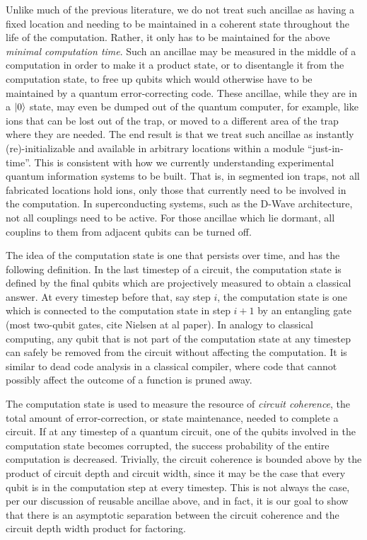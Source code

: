 \documentclass{article}
\begin{document}
Unlike
much of the previous literature, we do not treat such ancillae as having a
fixed location and needing to be maintained in a coherent state throughout
the life of the computation. Rather, it only has to be maintained for the
above \emph{minimal computation time}. Such an ancillae may be measured
in the middle of a computation in order to make it a product state, or
to disentangle it from the computation state, to free up qubits which would
otherwise have to be maintained by a quantum error-correcting code. These
ancillae, while they are in a $\left\vert{0}\right\rangle$ state, may even be dumped out of the
quantum computer, for example, like ions that can be lost out of the trap,
or moved to a different area of the trap where they are needed. The end
result is that we treat such ancillae as instantly (re)-initializable and
available in arbitrary locations within a module ``just-in-time''. This is
consistent with how we currently understanding experimental quantum information
systems to be built. That is, in segmented ion traps, not all fabricated locations
hold ions, only those that currently need to be involved in the computation.
In superconducting systems, such as the D-Wave architecture, not all
couplings need to be active. For those ancillae which lie dormant, all
couplins to them from adjacent qubits can be turned off.

The idea of the computation state is one that persists over time, and has
the following definition. In the last timestep of a circuit, the computation
state is defined by
the final qubits which are projectively measured to obtain a classical
answer. At every timestep before that, say step $i$,
the computation state is one which is connected to the computation state in
step $i+1$ by an entangling gate (most two-qubit gates, cite Nielsen at al
paper). In analogy to classical computing, any qubit that is not part of the
computation state at any timestep can safely be removed from the circuit
without affecting the computation. It is similar to dead code analysis in a
classical compiler, where code that cannot possibly affect the outcome of
a function is pruned away.

The computation state is used to measure the resource of \emph{circuit coherence},
the total amount of error-correction, or state maintenance, needed to complete
a circuit. If at any timestep of a quantum circuit, one of the qubits involved
in the computation state becomes corrupted, the success probability of the
entire computation is decreased. Trivially, the circuit coherence is
bounded above by the product of circuit depth and circuit width, since it
may be the case that every qubit is in the computation step at every timestep.
This is not always the case, per our discussion of reusable ancillae above,
and in fact, it is our goal to show that there is an asymptotic separation
between the circuit coherence and the circuit depth width product for
factoring.
\end{document}
